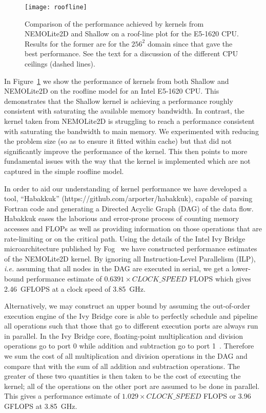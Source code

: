 \documentclass[gmd, manuscript]{copernicus}
\begin{document}
\begin{figure}
\centering
\texttt{[image: roofline]}
\caption{Comparison of the performance achieved by kernels from
  NEMOLite2D and Shallow on a roof-line plot for the E5-1620
  CPU. Results for the former are for the $256^2$ domain since that
  gave the best performance. See the text for a discussion of the
  different CPU ceilings (dashed lines).}
\label{FIG_roofline}
\end{figure}

In Figure~\ref{FIG_roofline} we show the performance of kernels from
both Shallow and NEMOLite2D on the roofline model for an Intel E5-1620 CPU.
This demonstrates that the Shallow kernel is achieving a performance
roughly consistent with saturating the available memory bandwidth. In
contrast, the kernel taken from NEMOLite2D is struggling to reach a
performance consistent with saturating the bandwidth to main
memory. We experimented with reducing the problem size (so as to
ensure it fitted within cache) but that did not significantly improve
the performance of the kernel. This then points to more fundamental issues
with the way that the kernel is implemented which are not captured in the
simple roofline model.

In order to aid our understanding of kernel performance we have
developed a tool, ``Habakkuk'' (https://github.com/arporter/habakkuk),
capable of parsing Fortran code and generating a Directed Acyclic
Graph (DAG) of the data flow. Habakkuk eases the laborious and
error-prone process of counting memory accesses and FLOPs as well as
providing information on those operations that are rate-limiting or on
the critical path. Using the details of the Intel Ivy Bridge
microarchitecture published by Fog~\citep{fog_microarch,
  fog_instructions} we have constructed performance estimates of the
NEMOLite2D kernel. By ignoring all Instruction-Level Parallelism
(ILP), \textit{i.e.} assuming that all nodes in the DAG are executed
in serial, we get a lower-bound performance estimate of $0.6391 \times
CLOCK\_SPEED$ FLOPS which gives 2.46~GFLOPS at a clock speed of
3.85~GHz.

Alternatively, we may construct an upper bound by assuming the
out-of-order execution engine of the Ivy Bridge core is able to
perfectly schedule and pipeline all operations such that those that go
to different execution ports are always run in parallel. In the Ivy
Bridge core, floating-point multiplication and division operations go
to port 0 while addition and subtraction go to port
1~\citep{fog_instructions}. Therefore we sum the cost of all
multiplication and division operations in the DAG and compare that
with the sum of all addition and subtraction operations. The greater
of these two quantities is then taken to be the cost of executing the
kernel; all of the operations on the other port are assumed to be done
in parallel. This gives a performance estimate of $1.029 \times
CLOCK\_SPEED$ FLOPS or 3.96 GFLOPS at 3.85~GHz.
\end{document}

